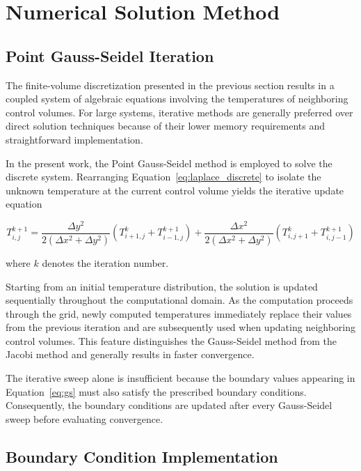 \section{Numerical Solution Method}

\subsection{Point Gauss-Seidel Iteration}

The finite-volume discretization presented in the previous section results in a coupled system of algebraic equations involving the temperatures of neighboring control volumes. For large systems, iterative methods are generally preferred over direct solution techniques because of their lower memory requirements and straightforward implementation.

In the present work, the Point Gauss-Seidel method is employed to solve the discrete system. Rearranging Equation~\ref{eq:laplace_discrete} to isolate the unknown temperature at the current control volume yields the iterative update equation

\begin{equation}
T_{i,j}^{k+1}
=
\frac{\Delta y^2}{2(\Delta x^2+\Delta y^2)}
\left(
T_{i+1,j}^{k}
+
T_{i-1,j}^{k+1}
\right)
+
\frac{\Delta x^2}{2(\Delta x^2+\Delta y^2)}
\left(
T_{i,j+1}^{k}
+
T_{i,j-1}^{k+1}
\right)
\label{eq:gs}
\end{equation}

where $k$ denotes the iteration number.

Starting from an initial temperature distribution, the solution is updated sequentially throughout the computational domain. As the computation proceeds through the grid, newly computed temperatures immediately replace their values from the previous iteration and are subsequently used when updating neighboring control volumes. This feature distinguishes the Gauss-Seidel method from the Jacobi method and generally results in faster convergence.

The iterative sweep alone is insufficient because the boundary values appearing in Equation~\ref{eq:gs} must also satisfy the prescribed boundary conditions. Consequently, the boundary conditions are updated after every Gauss-Seidel sweep before evaluating convergence.


\subsection{Boundary Condition Implementation}

